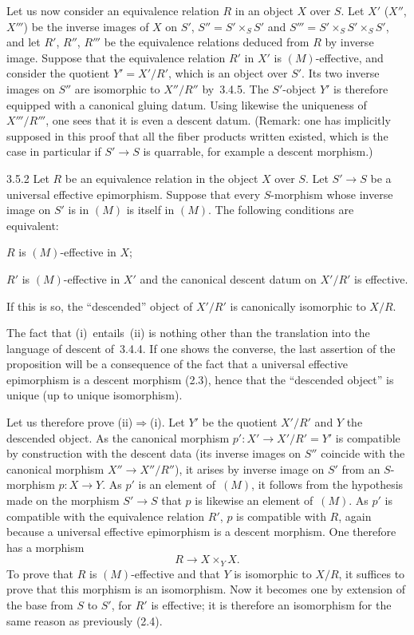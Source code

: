 Let us now consider an equivalence relation \(R\) in an object \(X\) over
\(S\). Let \(X'\) (\resp \(X''\), \resp \(X'''\)) be the inverse images of
\(X\) on \(S'\), \(S''=S'\times_{S}S'\) and
\(S'''=S'\times_{S}S'\times_{S}S'\), and let \(R'\), \(R''\), \(R'''\) be
the equivalence relations deduced from \(R\) by inverse image. Suppose
that the equivalence relation \(R'\) in \(X'\) is \((M)\)-effective, and
consider the quotient \(Y'=X'/R'\), which is an object over \(S'\). Its
two inverse images on \(S''\) are isomorphic to \(X''/R''\) by~3.4.5. The
\(S'\)-object \(Y'\) is therefore equipped with a canonical gluing datum.
Using likewise the uniqueness of \(X'''/R'''\), one sees that it is even a
descent datum. (Remark: one has implicitly supposed in this proof that
all the fiber products written existed, which is the case in particular if
\(S'\to S\) is quarrable, for example a descent morphism.)

\begin{proposition}{3.5.2}
\label{IV.3.5.2}
Let \(R\) be an equivalence relation in the object \(X\) over \(S\). Let
\(S'\to S\) be a universal effective epimorphism. Suppose that every
\(S\)-morphism whose inverse image on \(S'\) is in \((M)\) is itself in
\((M)\). The following conditions are equivalent:
\begin{enumeratei}
\item \(R\) is \((M)\)-effective in \(X\);
\item \(R'\) is \((M)\)-effective in \(X'\) and the canonical descent datum
on \(X'/R'\) is effective.
\end{enumeratei}
If this is so, the ``descended'' object of \(X'/R'\) is canonically
isomorphic to \(X/R\).
\end{proposition}

The fact that (i)~entails~(ii) is nothing other than the translation into
the language of descent of~3.4.4.%
If one shows the converse, the last assertion of the proposition will be a
consequence of the fact that a universal effective epimorphism is a
descent morphism (2.3), hence that the ``descended object'' is unique (up
to unique isomorphism).

Let us therefore prove (ii)\(\Rightarrow\)(i). Let \(Y'\) be the quotient
\(X'/R'\) and \(Y\) the descended object. As the canonical morphism
\(p'\colon X'\to X'/R'=Y'\) is compatible by construction with the descent
data (its inverse images on \(S''\) coincide with the canonical morphism
\(X''\to X''/R''\)), it arises by inverse image on \(S'\) from an
\(S\)-morphism \(p\colon X\to Y\). As \(p'\) is an element of~\((M)\), it
follows from the hypothesis made on the morphism \(S'\to S\) that \(p\) is
likewise an element of~\((M)\). As \(p'\) is compatible with the
equivalence relation \(R'\), \(p\) is compatible with \(R\), again because
a universal effective epimorphism is a descent morphism. One therefore
has a morphism
\[
R\longrightarrow X\times_{Y}X.
\]
To prove that \(R\) is \((M)\)-effective and that \(Y\) is isomorphic to
\(X/R\), it suffices to prove that this morphism is an isomorphism. Now it
becomes one by extension of the base from \(S\) to \(S'\), for \(R'\) is
effective; it is therefore an isomorphism for the same reason as
previously (2.4).

